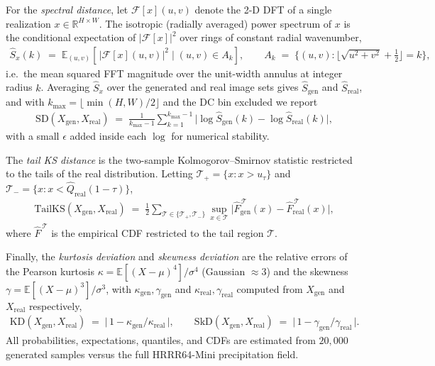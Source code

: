 \documentclass{article}
\theoremstyle{plain}
\theoremstyle{definition}
\theoremstyle{remark}
\begin{document}
For the \textit{spectral distance}, let $\mathcal{F}[x](u,v)$ denote the 2-D
DFT of a single realization $x \in \mathbb{R}^{H \times W}$. The isotropic
(radially averaged) power spectrum of $x$ is the conditional expectation of
$|\mathcal{F}[x]|^2$ over rings of constant radial wavenumber,
\begin{align}
  \hat{S}_x(k)
  \;=\;
  \mathbb{E}_{(u,v)}\!\left[\,\bigl|\mathcal{F}[x](u,v)\bigr|^2
    \;\Big|\; (u,v) \in A_k\right],
  \qquad
  A_k \;=\; \bigl\{(u,v) : \lfloor\sqrt{u^2+v^2}+\tfrac{1}{2}\rfloor = k\bigr\},
\end{align}
i.e.\ the mean squared FFT magnitude over the unit-width annulus at integer
radius $k$. Averaging $\hat{S}_x$ over the generated and real image sets gives
$\hat{S}_{\mathrm{gen}}$ and $\hat{S}_{\mathrm{real}}$, and with
$k_{\max} = \lfloor \min(H,W)/2 \rfloor$ and the DC bin excluded we report
\begin{align}
  \mathrm{SD}(X_{\mathrm{gen}}, X_{\mathrm{real}})
  \;=\;
  \frac{1}{k_{\max}-1}
  \sum_{k=1}^{k_{\max}-1}
  \bigl|\log \hat{S}_{\mathrm{gen}}(k) - \log \hat{S}_{\mathrm{real}}(k)\bigr|,
\end{align}
with a small $\epsilon$ added inside each $\log$ for numerical stability.

The \textit{tail KS distance} is the two-sample Kolmogorov--Smirnov statistic
restricted to the tails of the real distribution. Letting
$\mathcal{T}_{+} = \{x : x > u_\tau\}$ and
$\mathcal{T}_{-} = \{x : x < \hat{Q}_{\mathrm{real}}(1-\tau)\}$,
\begin{align}
  \mathrm{TailKS}(X_{\mathrm{gen}}, X_{\mathrm{real}})
  \;=\;
  \tfrac{1}{2}\!\!\sum_{\mathcal{T}\in\{\mathcal{T}_+,\mathcal{T}_-\}}
  \sup_{x\in\mathcal{T}}
  \bigl|\hat{F}_{\mathrm{gen}}^{\,\mathcal{T}}(x)
        - \hat{F}_{\mathrm{real}}^{\,\mathcal{T}}(x)\bigr|,
\end{align}
where $\hat{F}^{\,\mathcal{T}}$ is the empirical CDF restricted to the tail
region $\mathcal{T}$.

Finally, the \textit{kurtosis deviation} and \textit{skewness deviation} are
the relative errors of the Pearson kurtosis
$\kappa = \mathbb{E}[(X-\mu)^4]/\sigma^4$ (Gaussian $\approx 3$) and the
skewness $\gamma = \mathbb{E}[(X-\mu)^3]/\sigma^3$, with
$\kappa_{\mathrm{gen}}, \gamma_{\mathrm{gen}}$ and
$\kappa_{\mathrm{real}}, \gamma_{\mathrm{real}}$ computed from
$X_{\mathrm{gen}}$ and $X_{\mathrm{real}}$ respectively,
\begin{align}
  \mathrm{KD}(X_{\mathrm{gen}}, X_{\mathrm{real}})
  \;=\;
  \bigl|\,1 - \kappa_{\mathrm{gen}}/\kappa_{\mathrm{real}}\,\bigr|,
  \qquad
  \mathrm{SkD}(X_{\mathrm{gen}}, X_{\mathrm{real}})
  \;=\;
  \bigl|\,1 - \gamma_{\mathrm{gen}}/\gamma_{\mathrm{real}}\,\bigr|.
\end{align}
All probabilities, expectations, quantiles, and CDFs are estimated from
$20{,}000$ generated samples versus the full HRRR64-Mini precipitation field.
\end{document}
